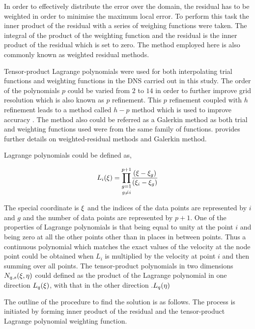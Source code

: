 In order to effectively distribute the error over the domain, the residual has to be weighted in order to minimise the maximum local error. To perform this task the inner product of the residual with a series of weighing functions were taken. The integral of the product of the weighting  function and the residual is the inner product of the residual which is set to zero. The method employed here is also commonly known as weighted residual methods. 

Tensor-product Lagrange polynomials were used for both interpolating trial functions and weighting functions in the DNS carried out in this study. The order of the polynomials $p$ could be varied from $2$ to $14$ in order to further improve grid resolution which is also known as $p$ refinement. This $p$ refinement coupled with $h$ refinement leads to a method called $h-p$ method which is used to improve accuracy \citep{karniadakis2005}. The method also could be referred as a Galerkin method as both trial and weighting functions used were from the same family of functions. \citet{Fletcher84,Fletcher91} provides further details on weighted-residual methods and Galerkin method. 

Lagrange polynomials could be defined as, 

\begin{equation} \centering
\label{eq:lagrange}
L_{i}(\compone) = \underset{g\neq i}{\prod_{g=1}^{p+1}}\frac{(\compone-\compone_{g})}{(\compone_{i}-\compone_{g})}
\end{equation}

The special coordinate is $\xi$ and the indices of the data points are represented by $i$ and $g$ and the number of data points are represented by $p+1$. One of the properties of Lagrange polynomials is that being equal to unity at the point $i$ and being zero at all the other points other than in places in between points. Thus a continuous polynomial which matches the exact values of the velocity at the node point  could be obtained when  $L_{i}$ is multiplied by the velocity at point $i$ and then summing over all points. The tensor-product polynomials in two dimensions $N_{q,s}(\xi, \eta)$ could defined as the product of the Lagrange polynomial in one direction $L_{q}(\xi)$, with that in the other direction .$L_{q}(\eta)$ 

The outline of the procedure to find the solution is as follows. The process is initiated by forming inner product of the residual and the tensor-product Lagrange polynomial weighting function.

